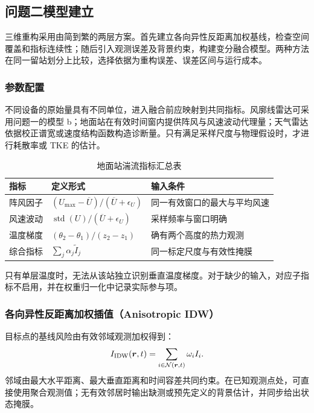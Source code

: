 \subsection{问题二模型建立}
三维重构采用由简到繁的两层方案。首先建立各向异性反距离加权基线，检查空间覆盖和指标连续性；随后引入观测误差及背景约束，构建变分融合模型。两种方法在同一留站划分上比较，选择依据为重构误差、误差区间与运行成本。
\subsubsection{参数配置}
不同设备的原始量具有不同单位，进入融合前应映射到共同指标。风廓线雷达可采用问题一的模型 b；地面站在有效时间窗内提供阵风与风速波动代理量；天气雷达依据校正谱宽或速度结构函数构造诊断量。只有满足采样尺度与物理假设时，才进行耗散率或 TKE 的估计。
\begin{table}[H]\centering\caption{地面站湍流指标汇总表}
\begin{tabularx}{\linewidth}{lYY}\toprule
指标 & 定义形式 & 输入条件\\\midrule
阵风因子 & $(U_{\max}-\overline U)/(\overline U+\epsilon_U)$ & 同一有效窗口的最大与平均风速\\
风速波动 & $\operatorname{std}(U)/ (\overline U+\epsilon_U)$ & 采样频率与窗口明确\\
温度梯度 & $(\theta_2-\theta_1)/(z_2-z_1)$ & 确有两个高度的热力观测\\
综合指标 & $\sum_j\alpha_j\widetilde I_j$ & 同一标定尺度与有效性掩膜\\\bottomrule
\end{tabularx}\end{table}
只有单层温度时，无法从该站独立识别垂直温度梯度。对于缺少的输入，对应子指标不启用，并在权重归一化中记录实际参与项。
\subsubsection{各向异性反距离加权插值（Anisotropic IDW）}
目标点的基线风险由有效邻域观测加权得到：
\begin{equation}
I_{\rm IDW}(\bm r,t)=\sum_{i\in\mathcal N(\bm r,t)}\omega_i I_i.
\end{equation}
邻域由最大水平距离、最大垂直距离和时间容差共同约束。在已知观测点处，可直接使用聚合观测值；无有效邻居时输出缺测或预先定义的背景估计，并同步给出状态掩膜。
